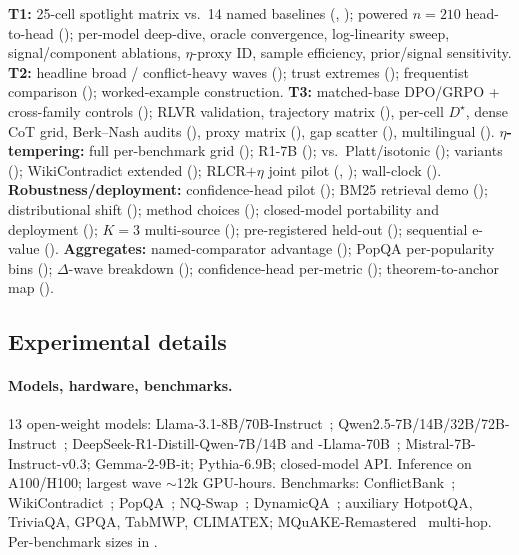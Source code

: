 \textbf{T1:} 25-cell spotlight matrix vs.\ 14 named baselines
(, ); powered $n\!=\!210$
head-to-head (); per-model deep-dive,
oracle convergence, log-linearity sweep, signal/component ablations,
$\eta$-proxy ID, sample efficiency, prior/signal sensitivity.
\textbf{T2:} headline broad / conflict-heavy waves
(); trust extremes
(); frequentist comparison
(); worked-example construction.
\textbf{T3:} matched-base DPO/GRPO + cross-family controls
(); RLVR validation, trajectory matrix
(), per-cell $D^\star$, dense CoT grid,
Berk--Nash audits (), proxy matrix
(), gap scatter
(), multilingual ().
\textbf{$\eta$-tempering:} full per-benchmark grid
(); R1-7B
(); vs.\ Platt/isotonic
(); variants
(); WikiContradict extended
(); RLCR$+\eta$ joint pilot
(, ); wall-clock
().
\textbf{Robustness/deployment:} confidence-head pilot
(); BM25 retrieval demo
(); distributional shift
(); method choices
(); closed-model portability and
deployment ();
$K\!=\!3$ multi-source ();
pre-registered held-out
(); sequential e-value
().
\textbf{Aggregates:} named-comparator advantage
(); PopQA per-popularity bins
(); $\Delta$-wave breakdown
(); confidence-head per-metric
(); theorem-to-anchor map
().

\subsection{Experimental details}
\label{app:experimental-details}

\paragraph{Models, hardware, benchmarks.}
13 open-weight models: Llama-3.1-8B/70B-Instruct~\citep{llama2024llama3};
Qwen2.5-7B/14B/32B/72B-Instruct~\citep{qwen2024qwen25};
DeepSeek-R1-Distill-Qwen-7B/14B and -Llama-70B~\citep{deepseek2025r1};
Mistral-7B-Instruct-v0.3; Gemma-2-9B-it; Pythia-6.9B; closed-model
API.  Inference on A100/H100; largest wave $\sim$12k GPU-hours.
Benchmarks: ConflictBank~\citep{su2024conflictbank};
WikiContradict~\citep{hou2024wikicontradict};
PopQA~\citep{mallen2023popqa}; NQ-Swap~\citep{xie2024conflictqa};
DynamicQA~\citep{marjanovic2024dynamicqa}; auxiliary HotpotQA,
TriviaQA, GPQA, TabMWP, CLIMATEX;
MQuAKE-Remastered~\citep{zhong2023mquake} multi-hop.  Per-benchmark
sizes in .

